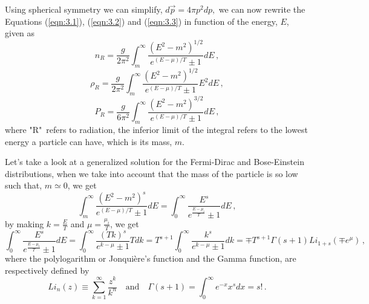 Using spherical symmetry we can simplify, $d\vec{p}=4\pi p^2dp,$ we can now rewrite the Equations (\ref{eqn:3.1}), (\ref{eqn:3.2}) and (\ref{eqn:3.3}) in function of the energy, $E$, given as
\begin{equation}
	\label{eqn:3.5}
	n_R=\frac{g}{2\pi^2}\int_{m}^{\infty} \frac{(E^2-m^2)^{1/2}}{e^{(E-\mu)/T}\pm 1}dE\,,
\end{equation}
\begin{equation}
	\label{eqn:3.6}
	\rho_R=\frac{g}{2\pi^2}\int_{m}^{\infty} \frac{(E^2-m^2)^{1/2}}{e^{(E-\mu)/T}\pm 1}E^2dE\,,
\end{equation} 
\begin{equation}
	\label{eqn:3.7}
	P_R=\frac{g}{6\pi^2}\int_{m}^{\infty} \frac{(E^2-m^2)^{3/2}}{e^{(E-\mu)/T}\pm 1}dE\,,
\end{equation}
where "R"\ refers to radiation, the inferior limit of the integral refers to the lowest energy a particle can have, which is its mass, $m$.

Let's take a look at a generalized solution for the Fermi-Dirac and Bose-Einstein distributions, when we take into account that the mass of the particle is so low such that, $m \simeq 0$, we get
\begin{equation}
	\nonumber
	\int_{m}^{\infty} \frac{(E^2-m^2)^s}{e^{(E-\mu)/T}\pm 1}dE =  	\int_{0}^{\infty}\frac{E^s}{e^{\frac{E-\mu_i}{T}}\pm 1}dE\,,
\end{equation}
by making $k=\frac{E}{T}$ and $\mu=\frac{\mu_i}{T}$, we get \cite{fermi}\cite{bose}
\begin{equation}
	\label{eqn:3.8}
	\int_{0}^{\infty}\frac{E^s}{e^{\frac{E-\mu_i}{T}}\pm 1}dE =\int_{0}^{\infty}\frac{(Tk)^s}{e^{k-\mu}\pm 1}Tdk=T^{s+1}\int_{0}^{\infty}\frac{k^s}{e^{k-\mu}\pm 1}dk=\mp T^{s+1} \Gamma(s+1)Li_{1+s}(\mp e^\mu)\,,
\end{equation}
where the polylogarithm or Jonquière's function and the Gamma function, are respectively defined by \cite{poly}
\begin{equation}
	\label{eqn:3.9}
	Li_n(z)\equiv\sum\limits_{k=1}^\infty \frac{z^k}{k^n} \quad \textrm{and} \quad \Gamma(s+1)=\int_{0}^{\infty} e^{-x}x^s dx=s!\,.
\end{equation}

